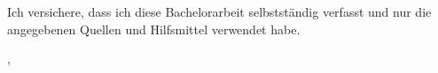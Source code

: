 \thispagestyle{empty}
\vspace*{0.8\textheight}
\noindent
Ich versichere, dass ich diese Bachelorarbeit selbstständig verfasst und nur die angegebenen Quellen und Hilfsmittel verwendet habe.

\vspace{15mm}
\noindent
\getSubmissionLocation{}, \getSubmissionDate{} \hspace{50mm} \getAuthor{}

\cleardoublepage{}
